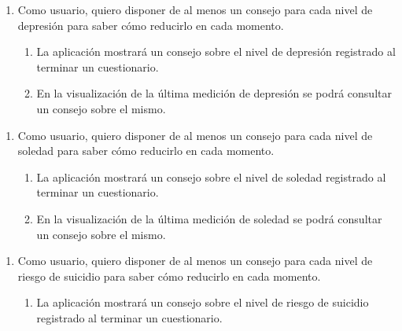         \begin{enumerate}[resume=req-usuario,label=\textbf{\texttt{RU-\arabic*}}]
            \item Como usuario, quiero disponer de al menos un consejo para cada nivel de depresión para saber cómo reducirlo en cada momento.
            \begin{enumerate}[resume=req-funcionales,label=\textbf{\texttt{RF-\arabic*}}]
                \item La aplicación mostrará un consejo sobre el nivel de depresión registrado al terminar un cuestionario.
                \item En la visualización de la última medición de depresión se podrá consultar un consejo sobre el mismo.
            \end{enumerate}
        \end{enumerate}
        \begin{enumerate}[resume=req-usuario,label=\textbf{\texttt{RU-\arabic*}}]
            \item Como usuario, quiero disponer de al menos un consejo para cada nivel de soledad para saber cómo reducirlo en cada momento.
            \begin{enumerate}[resume=req-funcionales,label=\textbf{\texttt{RF-\arabic*}}]
                \item La aplicación mostrará un consejo sobre el nivel de soledad registrado al terminar un cuestionario.
                \item En la visualización de la última medición de soledad se podrá consultar un consejo sobre el mismo. 
            \end{enumerate}
        \end{enumerate}
        \begin{enumerate}[resume=req-usuario,label=\textbf{\texttt{RU-\arabic*}}]
            \item Como usuario, quiero disponer de al menos un consejo para cada nivel de riesgo de suicidio para saber cómo reducirlo en cada momento.
            \begin{enumerate}[resume=req-funcionales,label=\textbf{\texttt{RF-\arabic*}}]
                \item La aplicación mostrará un consejo sobre el nivel de riesgo de suicidio registrado al terminar un cuestionario.
            \end{enumerate}
        \end{enumerate}
